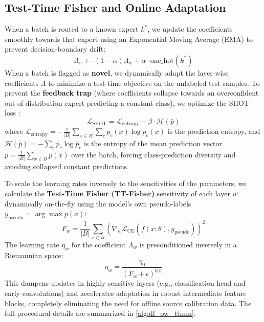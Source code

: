 \documentclass{article}
\theoremstyle{plain}
\theoremstyle{definition}
\theoremstyle{remark}
\begin{document}
\subsection{Test-Time Fisher and Online Adaptation}
When a batch is routed to a known expert $k^*$, we update the coefficients smoothly towards that expert using an Exponential Moving Average (EMA) to prevent decision-boundary drift:
\begin{equation}
    \Lambda_{w} \leftarrow (1-\alpha)\Lambda_{w} + \alpha \cdot \text{one\_hot}(k^*)
\end{equation}
When a batch is flagged as \textbf{novel}, we dynamically adapt the layer-wise coefficients $\Lambda$ to minimize a test-time objective on the unlabeled test samples. To prevent the \textbf{feedback trap} (where coefficients collapse towards an overconfident out-of-distribution expert predicting a constant class), we optimize the SHOT loss \cite{bhardwaj2022unsupervised}:
\begin{equation}
\label{eq:shot}
    \mathcal{L}_{\text{SHOT}} = \mathcal{L}_{\text{entropy}} - \beta \cdot \mathcal{H}(\bar{p})
\end{equation}
where $\mathcal{L}_{\text{entropy}} = -\frac{1}{|B|} \sum_{x \in B} \sum_c p_c(x) \log p_c(x)$ is the prediction entropy, and $\mathcal{H}(\bar{p}) = -\sum_c \bar{p}_c \log \bar{p}_c$ is the entropy of the mean prediction vector $\bar{p} = \frac{1}{|B|}\sum_{x \in B} p(x)$ over the batch, forcing class-prediction diversity and avoiding collapsed constant predictions.

To scale the learning rates inversely to the sensitivities of the parameters, we calculate the \textbf{Test-Time Fisher (TT-Fisher)} sensitivity of each layer $w$ dynamically on-the-fly using the model's own pseudo-labels $y_{\text{pseudo}} = \arg\max p(x)$:
\begin{equation}
\label{eq:fisher}
    F_w = \frac{1}{|B|} \sum_{x \in B} \left( \nabla_w \mathcal{L}_{\text{CE}}(f(x; \theta), y_{\text{pseudo}}) \right)^2
\end{equation}
The learning rate $\eta_w$ for the coefficient $\Lambda_w$ is preconditioned inversely in a Riemannian space:
\begin{equation}
    \eta_w = \frac{\eta_0}{(F_w + \epsilon)^{0.5}}
\end{equation}
This dampens updates in highly sensitive layers (e.g., classification head and early convolutions) and accelerates adaptation in robust intermediate feature blocks, completely eliminating the need for offline source calibration data. The full procedural details are summarized in \cref{alg:df_ow_ttmm}.
\end{document}

